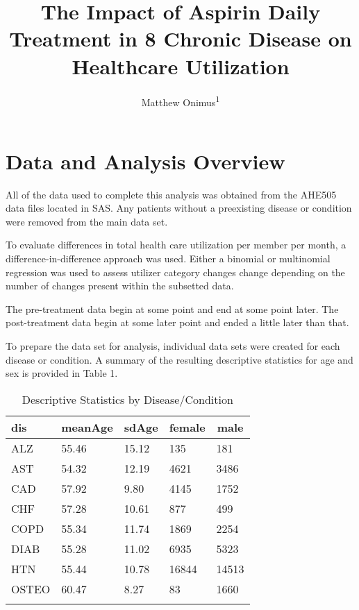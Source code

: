 \documentclass[
  english,
  man]{apa6}
\title{The Impact of Aspirin Daily Treatment in 8 Chronic Disease on Healthcare Utilization}
\author{Matthew Onimus\textsuperscript{1}}
\date{}
\affiliation{\vspace{0.5cm}\textsuperscript{1} Merck \& Co C/O Jefferson Univserity}
\begin{document}
\maketitle

\hypertarget{data-and-analysis-overview}{%
\section{Data and Analysis Overview}\label{data-and-analysis-overview}}

All of the data used to complete this analysis was obtained from the AHE505 data files located in SAS. Any patients without a preexisting disease or condition were removed from the main data set.

To evaluate differences in total health care utilization per member per month, a difference-in-difference approach was used. Either a binomial or multinomial regression was used to assess utilizer category changes change depending on the number of changes present within the subsetted data.

The pre-treatment data begin at some point and end at some point later. The post-treatment data begin at some later point and ended a little later than that.

To prepare the data set for analysis, individual data sets were created for each disease or condition. A summary of the resulting descriptive statistics for age and sex is provided in Table 1.

\begin{table}[tbp]

\begin{center}
\begin{threeparttable}

\caption{\label{tab:table1}Descriptive Statistics by Disease/Condition}

\begin{tabular}{lllll}
\toprule{}
dis & \multicolumn{1}{c}{meanAge} & \multicolumn{1}{c}{sdAge} & \multicolumn{1}{c}{female} & \multicolumn{1}{c}{male}\\
\midrule{}
ALZ & 55.46 & 15.12 & 135 & 181\\
AST & 54.32 & 12.19 & 4621 & 3486\\
CAD & 57.92 & 9.80 & 4145 & 1752\\
CHF & 57.28 & 10.61 & 877 & 499\\
COPD & 55.34 & 11.74 & 1869 & 2254\\
DIAB & 55.28 & 11.02 & 6935 & 5323\\
HTN & 55.44 & 10.78 & 16844 & 14513\\
OSTEO & 60.47 & 8.27 & 83 & 1660\\
\bottomrule{}
\end{tabular}

\end{threeparttable}
\end{center}

\end{table}
\end{document}
